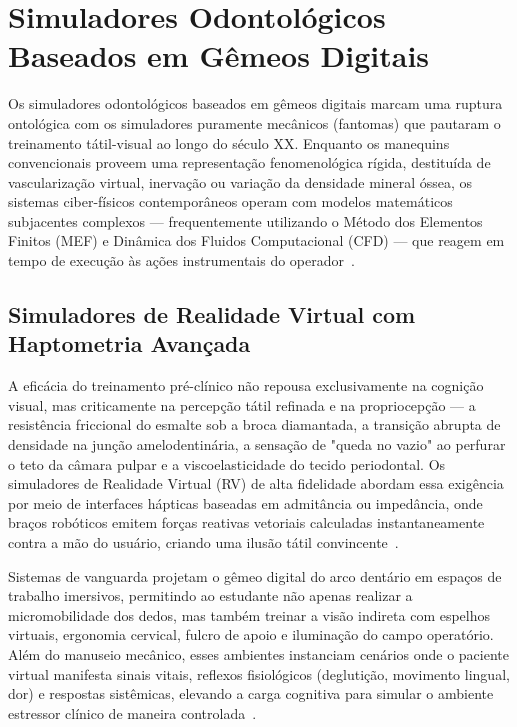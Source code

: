 \section{Simuladores Odontológicos Baseados em Gêmeos Digitais}
\label{sec:simuladores}

Os simuladores odontológicos baseados em gêmeos digitais marcam uma ruptura ontológica com os simuladores puramente mecânicos (fantomas) que pautaram o treinamento tátil-visual ao longo do século XX. Enquanto os manequins convencionais proveem uma representação fenomenológica rígida, destituída de vascularização virtual, inervação ou variação da densidade mineral óssea, os sistemas ciber-físicos contemporâneos operam com modelos matemáticos subjacentes complexos — frequentemente utilizando o Método dos Elementos Finitos (MEF) e Dinâmica dos Fluidos Computacional (CFD) — que reagem em tempo de execução às ações instrumentais do operador~\cite{khoshfekr2025digital}.

\subsection{Simuladores de Realidade Virtual com Haptometria Avançada}
\label{subsec:rv}

A eficácia do treinamento pré-clínico não repousa exclusivamente na cognição visual, mas criticamente na percepção tátil refinada e na propriocepção — a resistência friccional do esmalte sob a broca diamantada, a transição abrupta de densidade na junção amelodentinária, a sensação de "queda no vazio" ao perfurar o teto da câmara pulpar e a viscoelasticidade do tecido periodontal. Os simuladores de Realidade Virtual (RV) de alta fidelidade abordam essa exigência por meio de interfaces hápticas baseadas em admitância ou impedância, onde braços robóticos emitem forças reativas vetoriais calculadas instantaneamente contra a mão do usuário, criando uma ilusão tátil convincente~\cite{alshadidi2024surface}.


Sistemas de vanguarda projetam o gêmeo digital do arco dentário em espaços de trabalho imersivos, permitindo ao estudante não apenas realizar a micromobilidade dos dedos, mas também treinar a visão indireta com espelhos virtuais, ergonomia cervical, fulcro de apoio e iluminação do campo operatório. Além do manuseio mecânico, esses ambientes instanciam cenários onde o paciente virtual manifesta sinais vitais, reflexos fisiológicos (deglutição, movimento lingual, dor) e respostas sistêmicas, elevando a carga cognitiva para simular o ambiente estressor clínico de maneira controlada~\cite{olawade2026advancing}.

